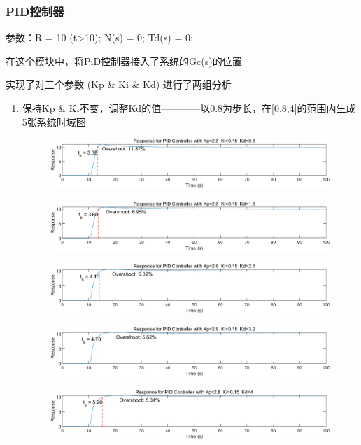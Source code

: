 \documentclass{thuemp}
\begin{document}
\subsubsection{PID控制器}
参数：R = 10 (t>10);  N(s) = 0;  Td(s) = 0;

在这个模块中，将PiD控制器接入了系统的Gc(s)的位置

实现了对三个参数 (Kp \& Ki \& Kd) 进行了两组分析
\begin{enumerate}
  \item 保持Kp \& Ki不变，调整Kd的值————以0.8为步长，在[0.8,4]的范围内生成5张系统时域图
  \begin{figure}[H]
    \centering
    \includegraphics[width=1\linewidth]{./img/PID/pi1.png}
  \end{figure}
  \begin{figure}[H]
    \centering
    \includegraphics[width=1\linewidth]{./img/PID/pi2.png}
  \end{figure}
  \begin{figure}[H]
    \centering
    \includegraphics[width=1\linewidth]{./img/PID/pi3.png}
  \end{figure}
  \begin{figure}[H]
    \centering
    \includegraphics[width=1\linewidth]{./img/PID/pi4.png}
  \end{figure}
  \begin{figure}[H]
    \centering
    \includegraphics[width=1\linewidth]{./img/PID/pi5.png}
  \end{figure}


\end{enumerate}
\end{document}
